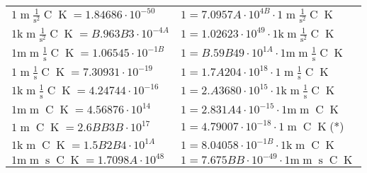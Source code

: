 \begin{center}
\begin{longtable}{l l}
{\color{black}$1 \bm{\mathrm{ }}{\operatorname{m}}\frac1{\operatorname{s}^2}{\operatorname{C}}{\operatorname{K}} = 1.84686\cdot10^{-50} $}   & {\color{black}$ 1 = 7.0957A\cdot10^{4B} \cdot 1 \bm{\mathrm{ }}{\operatorname{m}}\frac1{\operatorname{s}^2}{\operatorname{C}}{\operatorname{K}}$}  \\
{\color{gray}$1 \bm{\mathrm{ k}}{\operatorname{m}}\frac1{\operatorname{s}^2}{\operatorname{C}}{\operatorname{K}} = B.963B3\cdot10^{-4A} $}   & {\color{gray}$ 1 = 1.02623\cdot10^{49} \cdot 1 \bm{\mathrm{ k}}{\operatorname{m}}\frac1{\operatorname{s}^2}{\operatorname{C}}{\operatorname{K}}$}  \\
{\color{gray}$1 \bm{\mathrm{ m}}{\operatorname{m}}\frac1{\operatorname{s}}{\operatorname{C}}{\operatorname{K}} = 1.06545\cdot10^{-1B} $}   & {\color{gray}$ 1 = B.59B49\cdot10^{1A} \cdot 1 \bm{\mathrm{ m}}{\operatorname{m}}\frac1{\operatorname{s}}{\operatorname{C}}{\operatorname{K}}$}  \\
{\color{black}$1 \bm{\mathrm{ }}{\operatorname{m}}\frac1{\operatorname{s}}{\operatorname{C}}{\operatorname{K}} = 7.30931\cdot10^{-19} $}   & {\color{black}$ 1 = 1.7A204\cdot10^{18} \cdot 1 \bm{\mathrm{ }}{\operatorname{m}}\frac1{\operatorname{s}}{\operatorname{C}}{\operatorname{K}}$}  \\
{\color{gray}$1 \bm{\mathrm{ k}}{\operatorname{m}}\frac1{\operatorname{s}}{\operatorname{C}}{\operatorname{K}} = 4.24744\cdot10^{-16} $}   & {\color{gray}$ 1 = 2.A3680\cdot10^{15} \cdot 1 \bm{\mathrm{ k}}{\operatorname{m}}\frac1{\operatorname{s}}{\operatorname{C}}{\operatorname{K}}$}  \\
{\color{gray}$1 \bm{\mathrm{ m}}{\operatorname{m}}{}{\operatorname{C}}{\operatorname{K}} = 4.56876\cdot10^{14} $}   & {\color{gray}$ 1 = 2.831A4\cdot10^{-15} \cdot 1 \bm{\mathrm{ m}}{\operatorname{m}}{}{\operatorname{C}}{\operatorname{K}}$}  \\
{\color{black}$1 \bm{\mathrm{ }}{\operatorname{m}}{}{\operatorname{C}}{\operatorname{K}} = 2.6BB3B\cdot10^{17} $}   & {\color{black}$ 1 = 4.79007\cdot10^{-18} \cdot 1 \bm{\mathrm{ }}{\operatorname{m}}{}{\operatorname{C}}{\operatorname{K}}$}\quad(*)\\
{\color{gray}$1 \bm{\mathrm{ k}}{\operatorname{m}}{}{\operatorname{C}}{\operatorname{K}} = 1.5B2B4\cdot10^{1A} $}   & {\color{gray}$ 1 = 8.04058\cdot10^{-1B} \cdot 1 \bm{\mathrm{ k}}{\operatorname{m}}{}{\operatorname{C}}{\operatorname{K}}$}  \\
{\color{gray}$1 \bm{\mathrm{ m}}{\operatorname{m}}{\operatorname{s}}{\operatorname{C}}{\operatorname{K}} = 1.7098A\cdot10^{48} $}   & {\color{gray}$ 1 = 7.675BB\cdot10^{-49} \cdot 1 \bm{\mathrm{ m}}{\operatorname{m}}{\operatorname{s}}{\operatorname{C}}{\operatorname{K}}$}  \\

\end{longtable}
\end{center}
